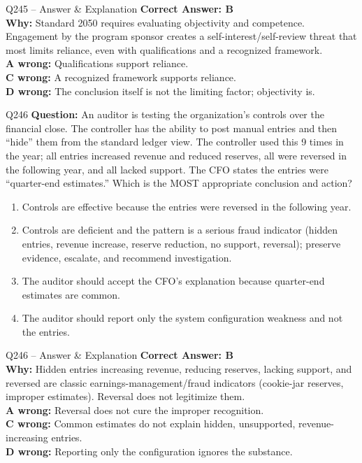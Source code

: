 \documentclass[aspectratio=169,10pt]{beamer}
\begin{document}
	\begin{frame}[t]{Q245 -- Answer \& Explanation}
		\small
		\textbf{Correct Answer: B} \\[4pt]
		\textbf{Why:} Standard 2050 requires evaluating objectivity and competence. Engagement by the program sponsor creates a self-interest/self-review threat that most limits reliance, even with qualifications and a recognized framework. \\[4pt]
		\textbf{A wrong:} Qualifications support reliance. \\[2pt]
		\textbf{C wrong:} A recognized framework supports reliance. \\[2pt]
		\textbf{D wrong:} The conclusion itself is not the limiting factor; objectivity is.
	\end{frame}
	
	\begin{frame}[t]{Q246}
		\small
		\textbf{Question:} An auditor is testing the organization's controls over the financial close. The controller has the ability to post manual entries and then ``hide'' them from the standard ledger view. The controller used this 9 times in the year; all entries increased revenue and reduced reserves, all were reversed in the following year, and all lacked support. The CFO states the entries were ``quarter-end estimates.'' Which is the MOST appropriate conclusion and action?
		\begin{enumerate}[label=\Alph*.,itemsep=1pt,topsep=2pt]
			\item Controls are effective because the entries were reversed in the following year.
			\item Controls are deficient and the pattern is a serious fraud indicator (hidden entries, revenue increase, reserve reduction, no support, reversal); preserve evidence, escalate, and recommend investigation.
			\item The auditor should accept the CFO's explanation because quarter-end estimates are common.
			\item The auditor should report only the system configuration weakness and not the entries.
		\end{enumerate}
	\end{frame}
	
	\begin{frame}[t]{Q246 -- Answer \& Explanation}
		\small
		\textbf{Correct Answer: B} \\[4pt]
		\textbf{Why:} Hidden entries increasing revenue, reducing reserves, lacking support, and reversed are classic earnings-management/fraud indicators (cookie-jar reserves, improper estimates). Reversal does not legitimize them. \\[4pt]
		\textbf{A wrong:} Reversal does not cure the improper recognition. \\[2pt]
		\textbf{C wrong:} Common estimates do not explain hidden, unsupported, revenue-increasing entries. \\[2pt]
		\textbf{D wrong:} Reporting only the configuration ignores the substance.
	\end{frame}
	
\end{document}
